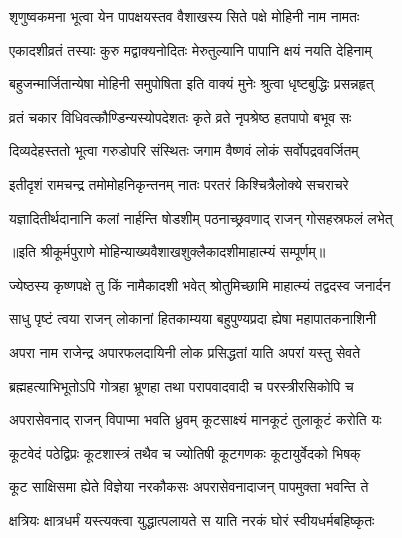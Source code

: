\twolineshloka
{शृणुष्वकमना भूत्वा येन पापक्षयस्तव}
{वैशाखस्य सिते पक्षे मोहिनी नाम नामतः} %

\twolineshloka
{एकादशीव्रतं तस्याः कुरु मद्वाक्यनोदितः}
{मेरुतुल्यानि पापानि क्षयं नयति देहिनाम्} %

\twolineshloka
{बहुजन्मार्जितान्येषा मोहिनी समुपोषिता}
{इति वाक्यं मुनेः श्रुत्वा धृष्टबुद्धिः प्रसन्नहृत्} %

\twolineshloka
{व्रतं चकार विधिवत्कौण्डिन्यस्योपदेशतः}
{कृते व्रते नृपश्रेष्ठ हतपापो बभूव सः} %

\twolineshloka
{दिव्यदेहस्ततो भूत्वा गरुडोपरि संस्थितः}
{जगाम वैष्णवं लोकं सर्वोपद्रववर्जितम्} %

\twolineshloka
{इतीदृशं रामचन्द्र तमोमोहनिकृन्तनम्}
{नातः परतरं किश्चित्रैलोक्ये सचराचरे} %

\twolineshloka
{यज्ञादितीर्थदानानि कलां नार्हन्ति षोडशीम्}
{पठनाच्छ्रवणाद् राजन् गोसहस्रफलं लभेत्} %

॥इति श्रीकूर्मपुराणे मोहिन्याख्यवैशाखशुक्लैकादशीमाहात्म्यं सम्पूर्णम्॥


\hyperref[sec:ekadashi_mahatmyam_vrata_raja]{\closesub}
\clearpage

\label{sec:vrata-raja-jyeshtha-krishnapara}


\twolineshloka
{ज्येष्ठस्य कृष्णपक्षे तु किं नामैकादशी भवेत्}
{श्रोतुमिच्छामि माहात्म्यं तद्वदस्व जनार्दन} %


\twolineshloka
{साधु पृष्टं त्वया राजन् लोकानां हितकाम्यया}
{बहुपुण्यप्रदा ह्येषा महापातकनाशिनी} %

\twolineshloka
{अपरा नाम राजेन्द्र अपारफलदायिनी}
{लोक प्रसिद्धतां याति अपरां यस्तु सेवते} %

\twolineshloka
{ब्रह्महत्याभिभूतोऽपि गोत्रहा भ्रूणहा तथा}
{परापवादवादी च परस्त्रीरसिकोपि च} %

\twolineshloka
{अपरासेवनाद् राजन् विपाप्मा भवति ध्रुवम्}
{कूटसाक्ष्यं मानकूटं तुलाकूटं करोति यः} %

\twolineshloka
{कूटवेदं पठेद्विप्रः कूटशास्त्रं तथैव च}
{ज्योतिषी कूटगणकः कूटायुर्वेदको भिषक्} %

\twolineshloka
{कूट साक्षिसमा ह्येते विज्ञेया नरकौकसः}
{अपरासेवनादाजन् पापमुक्ता भवन्ति ते} %

\twolineshloka
{क्षत्रियः क्षात्रधर्मं यस्त्यक्त्वा युद्धात्पलायते}
{स याति नरकं घोरं स्वीयधर्मबहिष्कृतः} %

